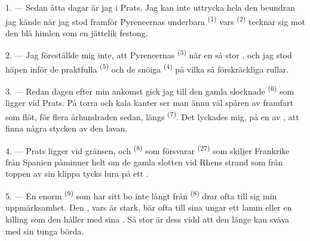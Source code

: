 
\VUsaut{4.0mm}
\VUsaut{3.0mm}

\VUsaut{3.0mm}

\VUsaut{3.0mm}

1. --- Sedan åtta dagar är jag i Prats. Jag kan inte uttrycka hela den beundran jag kände när
jag stod framför Pyreneernas underbara  \textsuperscript{(1)} vars
 \textsuperscript{(2)} tecknar sig mot den blå himlen som en jättelik festong.

2. --- Jag föreställde mig inte, att Pyreneernas  \textsuperscript{(3)} når en
så stor , och jag stod häpen inför de praktfulla 
\textsuperscript{(5)} och de snöiga
 \textsuperscript{(4)} på vilka så förskräckliga
 rullar.

\VUsaut{3.0mm}
\VUsaut{3.0mm}

3. --- Redan dagen efter min ankomst gick jag till den gamla slocknade
 \textsuperscript{(6)} som ligger vid Prats. På
 torra och kala kanter ser man ännu väl spåren av
 framfart som flöt, för flera århundraden sedan, längs
 \textsuperscript{(7)}. Det lyckades mig, på en av
, att finna några stycken av den lavan.

4. --- Prats ligger vid gränsen, och  \textsuperscript{(8)} som försvarar
 \textsuperscript{(27)} som skiljer Frankrike från Spanien påminner helt
om de gamla slotten vid Rhens strand som från toppen av sin klippa tycks lura på ett
.

5. --- En enorm  \textsuperscript{(9)} som har sitt bo inte långt från
 \textsuperscript{(8)} drar ofta till sig min uppmärksamhet. Den
, vars  är stark, bär ofta till sina ungar ett lamm eller en
killing som den håller med sina . Så stor är dess
 vidd att den länge kan sväva med sin tunga börda.

